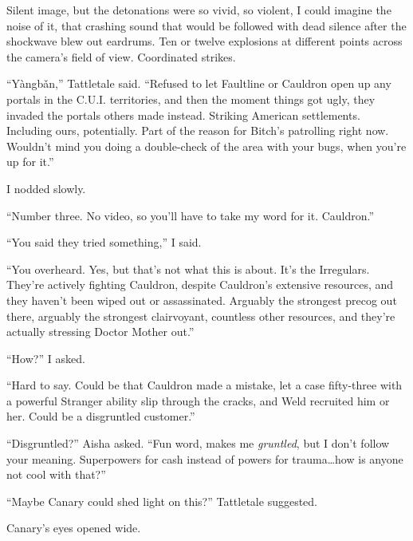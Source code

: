 Silent image, but the detonations were so vivid, so violent, I could imagine the noise of it, that crashing sound that would be followed with dead silence after the shockwave blew out eardrums.  Ten or twelve explosions at different points across the camera's field of view.  Coordinated strikes.



``Y\`{a}ngb\v{a}n,'' Tattletale said.  ``Refused to let Faultline or Cauldron open up any portals in the C.U.I. territories, and then the moment things got ugly, they invaded the portals others made instead.  Striking American settlements.  Including ours, potentially.  Part of the reason for Bitch's patrolling right now.  Wouldn't mind you doing a double-check of the area with your bugs, when you're up for it.''



I nodded slowly.



``Number three.  No video, so you'll have to take my word for it.  Cauldron.''



``You said they tried something,'' I said.



``You overheard.  Yes, but that's not what this is about.  It's the Irregulars.  They're actively fighting Cauldron, despite Cauldron's extensive resources, and they haven't been wiped out or assassinated.  Arguably the strongest precog out there, arguably the strongest clairvoyant, countless other resources, and they're actually stressing Doctor Mother out.''



``How?'' I asked.



``Hard to say.  Could be that Cauldron made a mistake, let a case fifty-three with a powerful Stranger ability slip through the cracks, and Weld recruited him or her.  Could be a disgruntled customer.''



``Disgruntled?'' Aisha asked.  ``Fun word, makes me \emph{gruntled}, but I don't follow your meaning.  Superpowers for cash instead of powers for trauma\ldots how is anyone not cool with that?''



``Maybe Canary could shed light on this?'' Tattletale suggested.



Canary's eyes opened wide.



